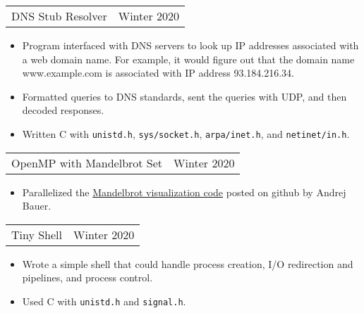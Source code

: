 \documentclass{article}
\newenvironment{compactItemize}{
  \begin{itemize}[itemsep=0ex, parsep=0ex, partopsep=0ex, topsep= -7pt]
}{
  \end{itemize}
}
\newcommand{\project}[2]{
  \begingroup
  \setlength{\tabcolsep}{0ex}
  \begin{tabularx}{\linewidth}{X r}
    #1 & %
    #2\\ %
  \end{tabularx}%
  \endgroup%
}
\begin{document}
\project{DNS Stub Resolver}{Winter 2020}
\begin{compactItemize}
  \item Program interfaced with DNS servers to look up IP addresses associated with a web domain name.
        For example, it would figure out that the domain name www.example.com is associated with IP address 93.184.216.34.
  \item Formatted queries to DNS standards, sent the queries with UDP, and then decoded responses.
  \item Written C with \texttt{unistd.h}, \texttt{sys/socket.h}, \texttt{arpa/inet.h}, and \texttt{netinet/in.h}.
\end{compactItemize}
\medskip

\project{OpenMP with Mandelbrot Set}{Winter 2020}
\begin{compactItemize}
  \item Parallelized the \href{https://gist.github.com/andrejbauer/7919569}{Mandelbrot visualization code} posted on github by Andrej Bauer.
\end{compactItemize}
\medskip

\project{Tiny Shell}{Winter 2020}
\begin{compactItemize}
  \item Wrote a simple shell that could handle process creation, I/O redirection and pipelines, and process control.
  \item Used C with \texttt{unistd.h} and \texttt{signal.h}.
\end{compactItemize}
\medskip
\end{document}
